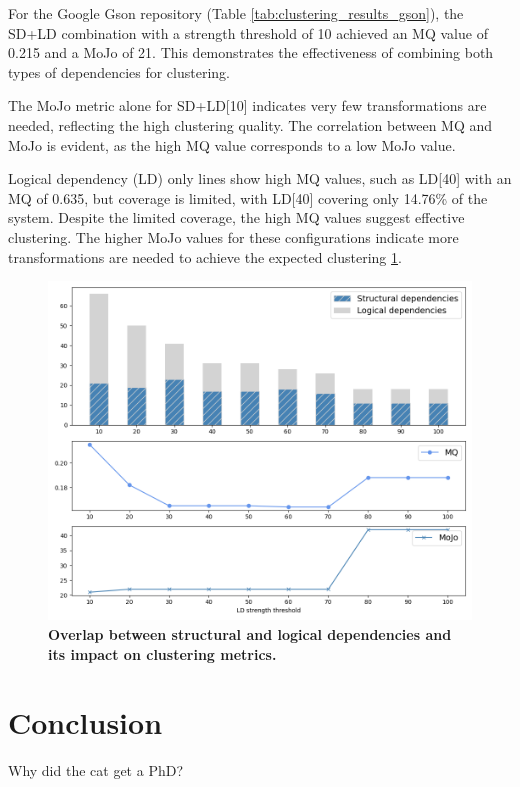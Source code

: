 \documentclass{ieeeaccess}
\begin{document}
For the Google Gson repository (Table \ref{tab:clustering_results_gson}), the SD+LD combination with a strength threshold of 10 achieved an MQ value of 0.215 and a MoJo of 21. This demonstrates the effectiveness of combining both types of dependencies for clustering.

The MoJo metric alone for SD+LD[10] indicates very few transformations are needed, reflecting the high clustering quality. The correlation between MQ and MoJo is evident, as the high MQ value corresponds to a low MoJo value.

Logical dependency (LD) only lines show high MQ values, such as LD[40] with an MQ of 0.635, but coverage is limited, with LD[40] covering only 14.76\% of the system. Despite the limited coverage, the high MQ values suggest effective clustering. The higher MoJo values for these configurations indicate more transformations are needed to achieve the expected clustering  \ref{fig:gson_correlation}.

\begin{figure}[t!]
  \centering
  \includegraphics[width=\columnwidth]{gson_correlation.png}
  \caption{\textbf{Overlap between structural and logical dependencies and its impact on clustering metrics.}}
  \label{fig:gson_correlation}
\end{figure}

\section{Conclusion}
\label{sec:conclusion}
Why did the cat get a PhD?
\end{document}

